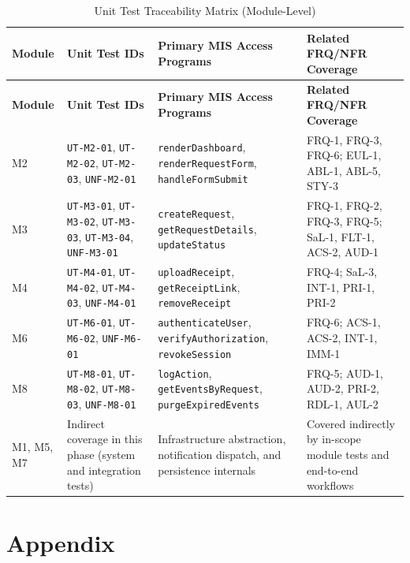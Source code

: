 \documentclass[12pt, titlepage]{article}
\begin{document}
\begin{longtable}{p{1.4cm} p{3.8cm} p{4.5cm} p{4.3cm}}
\caption{Unit Test Traceability Matrix (Module-Level)}\\
\toprule
\textbf{Module} & \textbf{Unit Test IDs} & \textbf{Primary MIS Access Programs} & \textbf{Related FRQ/NFR Coverage} \\
\midrule
\endfirsthead
\toprule
\textbf{Module} & \textbf{Unit Test IDs} & \textbf{Primary MIS Access Programs} & \textbf{Related FRQ/NFR Coverage} \\
\midrule
\endhead
\bottomrule
\endfoot
M2 & \texttt{UT-M2-01}, \texttt{UT-M2-02}, \texttt{UT-M2-03}, \texttt{UNF-M2-01}
& \texttt{renderDashboard}, \texttt{renderRequestForm}, \texttt{handleFormSubmit}
& FRQ-1, FRQ-3, FRQ-6; EUL-1, ABL-1, ABL-5, STY-3 \\
\midrule
M3 & \texttt{UT-M3-01}, \texttt{UT-M3-02}, \texttt{UT-M3-03}, \texttt{UT-M3-04}, \texttt{UNF-M3-01}
& \texttt{createRequest}, \texttt{getRequestDetails}, \texttt{updateStatus}
& FRQ-1, FRQ-2, FRQ-3, FRQ-5; SaL-1, FLT-1, ACS-2, AUD-1 \\
\midrule
M4 & \texttt{UT-M4-01}, \texttt{UT-M4-02}, \texttt{UT-M4-03}, \texttt{UNF-M4-01}
& \texttt{uploadReceipt}, \texttt{getReceiptLink}, \texttt{removeReceipt}
& FRQ-4; SaL-3, INT-1, PRI-1, PRI-2 \\
\midrule
M6 & \texttt{UT-M6-01}, \texttt{UT-M6-02}, \texttt{UNF-M6-01}
& \texttt{authenticateUser}, \texttt{verifyAuthorization}, \texttt{revokeSession}
& FRQ-6; ACS-1, ACS-2, INT-1, IMM-1 \\
\midrule
M8 & \texttt{UT-M8-01}, \texttt{UT-M8-02}, \texttt{UT-M8-03}, \texttt{UNF-M8-01}
& \texttt{logAction}, \texttt{getEventsByRequest}, \texttt{purgeExpiredEvents}
& FRQ-5; AUD-1, AUD-2, PRI-2, RDL-1, AUL-2 \\
\midrule
M1, M5, M7 & Indirect coverage in this phase (system and integration tests)
& Infrastructure abstraction, notification dispatch, and persistence internals
& Covered indirectly by in-scope module tests and end-to-end workflows \\
\end{longtable}
				




\newpage

\section{Appendix}
\end{document}
